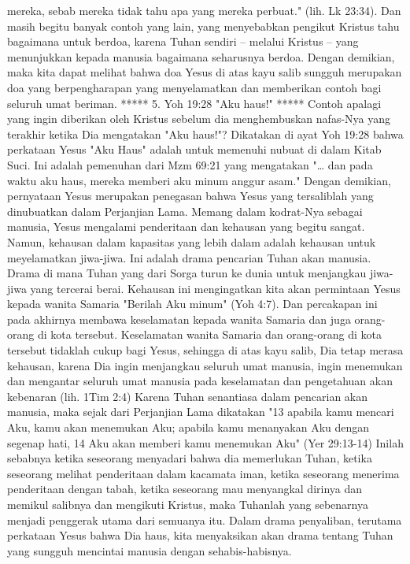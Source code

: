 mereka, sebab mereka tidak tahu apa yang mereka perbuat." (lih. Lk 23:34).
Dan masih begitu banyak contoh yang lain, yang menyebabkan pengikut Kristus
tahu bagaimana untuk berdoa, karena Tuhan sendiri – melalui Kristus – yang
menunjukkan kepada manusia bagaimana seharusnya berdoa.
Dengan demikian, maka kita dapat melihat bahwa doa Yesus di atas kayu salib
sungguh merupakan doa yang berpengharapan yang menyelamatkan dan memberikan
contoh bagi seluruh umat beriman.
***** 5. Yoh 19:28 "Aku haus!" *****
Contoh apalagi yang ingin diberikan oleh Kristus sebelum dia menghembuskan
nafas-Nya yang terakhir ketika Dia mengatakan "Aku haus!"? Dikatakan di ayat
Yoh 19:28 bahwa perkataan Yesus "Aku Haus" adalah untuk memenuhi nubuat di
dalam Kitab Suci. Ini adalah pemenuhan dari Mzm 69:21 yang mengatakan "… dan
pada waktu aku haus, mereka memberi aku minum anggur asam." Dengan demikian,
pernyataan Yesus merupakan penegasan bahwa Yesus yang tersaliblah yang
dinubuatkan dalam Perjanjian Lama.
Memang dalam kodrat-Nya sebagai manusia, Yesus mengalami penderitaan dan
kehausan yang begitu sangat. Namun, kehausan dalam kapasitas yang lebih dalam
adalah kehausan untuk meyelamatkan jiwa-jiwa. Ini adalah drama pencarian Tuhan
akan manusia. Drama di mana Tuhan yang dari Sorga turun ke dunia untuk
menjangkau jiwa-jiwa yang tercerai berai. Kehausan ini mengingatkan kita akan
permintaan Yesus kepada wanita Samaria "Berilah Aku minum" (Yoh 4:7). Dan
percakapan ini pada akhirnya membawa keselamatan kepada wanita Samaria dan juga
orang-orang di kota tersebut. Keselamatan wanita Samaria dan orang-orang di
kota tersebut tidaklah cukup bagi Yesus, sehingga di atas kayu salib, Dia tetap
merasa kehausan, karena Dia ingin menjangkau seluruh umat manusia, ingin
menemukan dan mengantar seluruh umat manusia pada keselamatan dan pengetahuan
akan kebenaran (lih. 1Tim 2:4)
Karena Tuhan senantiasa dalam pencarian akan manusia, maka sejak dari
Perjanjian Lama dikatakan "13 apabila kamu mencari Aku, kamu akan menemukan
Aku; apabila kamu menanyakan Aku dengan segenap hati, 14  Aku akan memberi kamu
menemukan Aku" (Yer 29:13-14) Inilah sebabnya ketika seseorang menyadari bahwa
dia memerlukan Tuhan, ketika seseorang melihat penderitaan dalam kacamata iman,
ketika seseorang menerima penderitaan dengan tabah, ketika seseorang mau
menyangkal dirinya dan memikul salibnya dan mengikuti Kristus, maka Tuhanlah
yang sebenarnya menjadi penggerak utama dari semuanya itu. Dalam drama
penyaliban, terutama perkataan Yesus bahwa Dia haus, kita menyaksikan akan
drama tentang Tuhan yang sungguh mencintai manusia dengan sehabis-habisnya.
